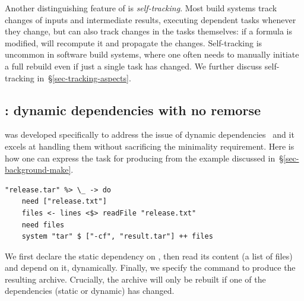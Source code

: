 Another distinguishing feature of \Excel is \emph{self-tracking}. Most build
systems track changes of inputs and intermediate results, executing dependent
tasks whenever they change, but \Excel can also track changes in the tasks
themselves: if a formula is modified, \Excel will recompute it and propagate
the changes. Self-tracking is uncommon in software build systems, where one
often needs to manually initiate a full rebuild even if just a single task has
changed. We further discuss self-tracking in~\S\ref{sec-tracking-aspects}.

\subsection{\Shake: dynamic dependencies with no remorse}
\label{sec-background-shake}

\Shake was developed specifically to address the issue of dynamic
dependencies~\cite{mitchell2012shake} and it excels at handling them without
sacrificing the minimality requirement. Here is how one can express the task
for producing  from the example discussed
in~\S\ref{sec-background-make}.

\vspace{1mm}
\begin{verbatim}
"release.tar" %> \_ -> do
    need ["release.txt"]
    files <- lines <$> readFile "release.txt"
    need files
    system "tar" $ ["-cf", "result.tar"] ++ files
\end{verbatim}
\vspace{1mm}

\noindent
We first declare the static dependency on , then read its
content (a list of files) and depend on it, dynamically. Finally, we specify the
command to produce the resulting archive. Crucially, the archive will only be
rebuilt if one of the dependencies (static or dynamic) has changed.

